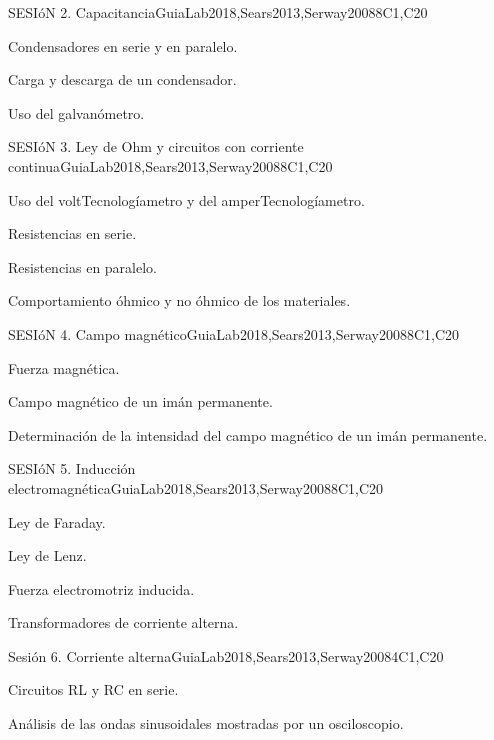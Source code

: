 \begin{syllabus}
\begin{unit}{SESIóN 2. Capacitancia}{}{GuiaLab2018,Sears2013,Serway2008}{8}{C1,C20}
\begin{topics}
      \item Condensadores en serie y en paralelo.
      \item Carga y descarga de un condensador.
      \item Uso del galvanómetro. 
\end{topics}
\end{unit}

\begin{unit}{SESIóN 3. Ley de Ohm y circuitos con corriente continua}{}{GuiaLab2018,Sears2013,Serway2008}{8}{C1,C20}
\begin{topics}
      \item Uso del voltTecnologíametro y del amperTecnologíametro.
      \item Resistencias en serie.
      \item Resistencias en paralelo.
      \item Comportamiento óhmico y no óhmico de los materiales.
\end{topics}
\end{unit}

\begin{unit}{SESIóN 4. Campo magnético}{}{GuiaLab2018,Sears2013,Serway2008}{8}{C1,C20}
\begin{topics}
      \item Fuerza magnética.
      \item Campo magnético de un imán permanente.
      \item Determinación de la intensidad del campo magnético de un imán permanente.
   \end{topics}
\end{unit}

\begin{unit}{SESIóN 5. Inducción electromagnética}{}{GuiaLab2018,Sears2013,Serway2008}{8}{C1,C20}
\begin{topics}
	\item Ley de Faraday.
	\item Ley de Lenz.
	\item Fuerza electromotriz inducida.
	\item Transformadores de corriente alterna.
   \end{topics}
\end{unit}

\begin{unit}{Sesión 6. Corriente alterna}{}{GuiaLab2018,Sears2013,Serway2008}{4}{C1,C20}
   \begin{topics}
	\item Circuitos RL y RC en serie.
	\item Análisis de las ondas sinusoidales mostradas por un osciloscopio.
   \end{topics}
\end{unit}



\begin{coursebibliography}
\end{coursebibliography}

\end{syllabus}
